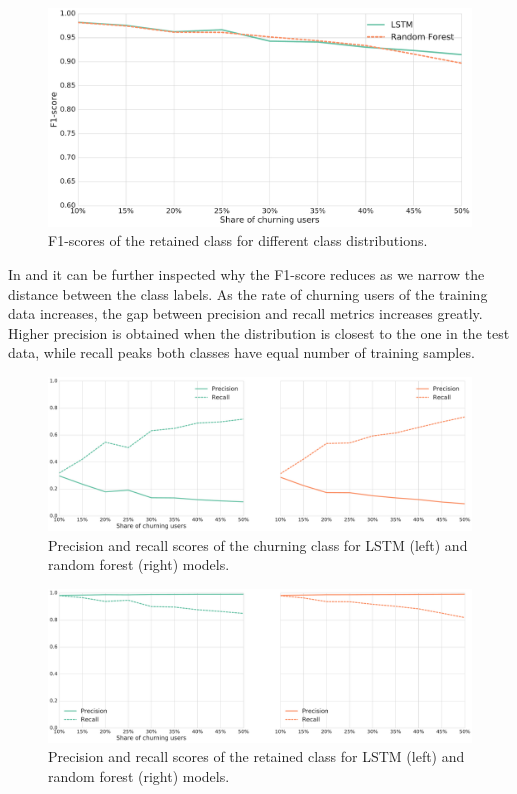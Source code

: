 \documentclass{kththesis}
\begin{document}
\begin{figure}[H]
    \centering
    \includegraphics[width=1.0\textwidth,keepaspectratio]{figures/line_class_balance_retained.pdf}
    \caption{F1-scores of the retained class for different class distributions.}
    \label{fig:line_class_balance_ret}
\end{figure}

In  and  it can be further inspected why the F1-score reduces as we narrow the distance between the class labels. As the rate of churning users of the training data increases, the gap between precision and recall metrics increases greatly. Higher precision is obtained when the distribution is closest to the one in the test data, while recall peaks both classes have equal number of training samples.

\begin{figure}[H]
    \centering
    \includegraphics[width=1.0\textwidth,keepaspectratio]{figures/prl_class_balance.pdf}
    \caption{Precision and recall scores of the churning class for LSTM (left) and random forest (right) models.}
    \label{fig:prl_class_balance}
\end{figure}

\begin{figure}[H]
    \centering
    \includegraphics[width=1.0\textwidth,keepaspectratio]{figures/prl_class_balance_retained.pdf}
    \caption{Precision and recall scores of the retained class for LSTM (left) and random forest (right) models.}
    \label{fig:prl_class_balance_ret}
\end{figure}
\end{document}
